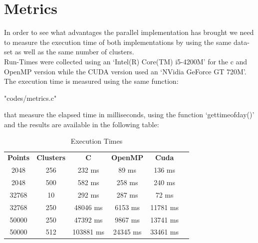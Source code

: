 \documentclass[10pt,twocolumn,letterpaper]{article}
\begin{document}
\section{Metrics}
In order to see what advantages the parallel implementation has brought we need to measure the execution time of both 
implementations by using the same data-set as well as the same number of clusters.\\
Run-Times were collected using an `Intel(R) Core(TM) i5-4200M' for the c and OpenMP version while the CUDA version used an
`NVidia GeForce GT 720M'.\\
The execution time is measured using the same function:\\
\begin{lstinputlisting}[language=C,style=CSnippetStyle,caption=Time Function,firstline=1,lastline=13]{
	"codes/metrics.c"}
\end{lstinputlisting}
that measure the elapsed time in milliseconds, using the function `gettimeofday()' and the results are available in the following table:
\\
\begin{table}[H]
\centering
\begin{tabular}{@{}cccccc@{}}
\textbf{Points} & \textbf{Clusters} & \textbf{C} & \textbf{OpenMP} & \textbf{Cuda} \\
2048 & 256 & 232 ms & 89 ms & 136 ms \\
2048 & 500 & 582 ms & 258 ms & 240 ms \\
32768 & 10 & 292 ms & 287 ms & 72 ms \\
32768 & 250 & 48046 ms & 6153 ms & 11781 ms \\
50000 & 250 & 47392 ms & 9867 ms & 13741 ms \\
50000 & 512 & 103881 ms & 24345 ms & 33461 ms \\
\end{tabular}
\caption{Execution Times}
\end{table}
\end{document}

